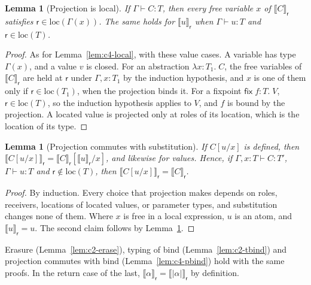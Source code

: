 \documentclass[11pt]{report}
\theoremstyle{plain}
\newtheorem{lemma}[theorem]{Lemma}
\theoremstyle{definition}
\theoremstyle{remark}
\newcommand{\kw}[1]{\mathsf{#1}}
\newcommand{\rr}{\mathsf{r}}
\newcommand{\loc}[1]{\mathrm{loc}(#1)}
\newcommand{\pay}[1]{\lvert #1\rvert}
\newcommand{\proj}[2]{\llbracket #1 \rrbracket_{#2}}
\newcommand{\clam}[3]{\lambda #1{:}#2.\;#3}
\newcommand{\cfix}[3]{\kw{fix}\;#1{:}#2.\;#3}
\begin{document}
\begin{lemma}[Projection is local]\label{lem:c5-local}
  If $\Gamma\vdash C:T$, then every free variable $x$ of $\proj{C}{\rr}$
  satisfies $\rr\in\loc{\Gamma(x)}$.  The same holds for $\proj{u}{\rr}$
  when $\Gamma\vdash u:T$ and $\rr\in\loc{T}$.
\end{lemma}
\begin{proof}
  As for Lemma~\ref{lem:c4-local}, with these value cases.  A variable has
  type $\Gamma(x)$, and a value $v$ is closed.  For an abstraction
  $\clam{x}{T_1}{C}$, the free variables of $\proj{C}{\rr}$ are held at
  $\rr$ under $\Gamma,x{:}T_1$ by the induction hypothesis, and $x$ is one of
  them only if $\rr\in\loc{T_1}$, when the projection binds it.  For a
  fixpoint $\cfix{f}{T}{V}$, $\rr\in\loc{T}$, so the induction hypothesis
  applies to $V$, and $f$ is bound by the projection.  A located value is
  projected only at roles of its location, which is the location of its
  type.
\end{proof}

\begin{lemma}[Projection commutes with substitution]\label{lem:c5-psubst}
  If $C[u/x]$ is defined, then
  $\proj{C[u/x]}{\rr}=\proj{C}{\rr}[\proj{u}{\rr}/x]$, and likewise for
  values.  Hence, if $\Gamma,x{:}T\vdash C:T'$, $\Gamma\vdash u:T$ and
  $\rr\notin\loc{T}$, then $\proj{C[u/x]}{\rr}=\proj{C}{\rr}$.
\end{lemma}
\begin{proof}
  By induction.  Every choice that projection makes depends on roles,
  receivers, locations of located values, or parameter types, and
  substitution changes none of them.  Where $x$ is free in a local
  expression, $u$ is an atom, and $\proj{u}{\rr}=u$.  The second claim
  follows by Lemma~\ref{lem:c5-local}.
\end{proof}

Erasure (Lemma~\ref{lem:c2-erase}), typing of bind
(Lemma~\ref{lem:c2-tbind}) and projection commutes with bind
(Lemma~\ref{lem:c4-pbind}) hold with the same proofs.  In the return case of
the last, $\proj{\alpha}{\rr}=\proj{\pay{\alpha}}{\rr}$ by definition.
\end{document}
